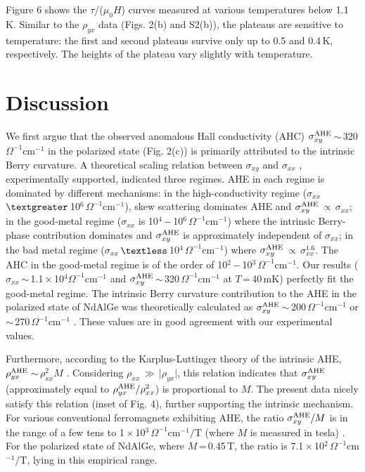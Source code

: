 \documentclass[%
preprint,
 amsmath,amssymb,
 aps,
]{revtex4-2}
\begin{document}
%
Figure 6 shows the $\tau$/($\mu_{0}H$) curves measured at various temperatures below 1.1 K. 
%
Similar to the $\rho_{yx}$ data (Figs. 2(b) and S2(b)), 
the plateaus are sensitive to temperature: 
the first and second plateaus survive only up to 0.5 and 0.4\,K, respectively. 
%
The heights of the plateau vary slightly with temperature.  
%

\section{Discussion}

%
We first argue that the observed anomalous Hall conductivity (AHC) 
$\sigma_{xy}^{\rm AHE}$\,$\sim$\,320\,$\Omega^{-1}$cm$^{-1}$ in the polarized state (Fig. 2(c)) 
is primarily attributed to the intrinsic Berry curvature. 
%
A theoretical scaling relation between $\sigma_{xy}$ and $\sigma_{xx}$ 
\cite{Onoda_PhyRevB_2008,Nagaosa_RevModPhys_2010,Chen_NatCommun_2021}, 
experimentally supported, indicated three regimes. 
%
AHE in each regime is dominated by different mechanisms: 
in the high-conductivity regime ($\sigma_{xx}$\,$\textgreater$\,10$^{6}$\,$\Omega^{-1}$cm$^{-1}$), 
skew scattering dominates AHE and $\sigma_{xy}^{\rm AHE}$\,$\propto$\,$\sigma_{xx}$; 
%
in the good-metal regime ($\sigma_{xx}$ is 10$^{4}$\,$-$\,10$^{6}$\,$\Omega^{-1}$cm$^{-1}$) 
where the intrinsic Berry-phase contribution dominates and 
$\sigma_{xy}^{\rm AHE}$ is approximately independent of $\sigma_{xx}$; 
%
in the bad metal regime ($\sigma_{xx}$\,$\textless$\,10$^{4}$\,$\Omega^{-1}$cm$^{-1}$) 
where $\sigma_{xy}^{\rm AHE}$\,$\propto$\,$\sigma_{xx}^{1.6}$. 
%
The AHC in the good-metal regime is of the order of 
10$^{2}$\,$-$\,10$^{3}$\,$\Omega^{-1}$cm$^{-1}$. 
%
Our results ($\sigma_{xx}$\,$\sim$\,1.1\,$\times$\,10$^{4}$$\Omega^{-1}$cm$^{-1}$ 
and $\sigma_{xy}^{\rm AHE}$\,$\sim$\,320\,$\Omega^{-1}$cm$^{-1}$ at $T$\,=\,40\,mK) 
perfectly fit the good-metal regime. 
%
The intrinsic Berry curvature contribution to the AHE in the polarized state of NdAlGe was theoretically calculated as $\sigma_{xy}^{\rm AHE}$\,$\sim$\,200\,$\Omega^{-1}$cm$^{-1}$ 
\cite{Yang_PhysRevMater_2023} or $\sim$\,270\,$\Omega^{-1}$cm$^{-1}$ 
\cite{Dhital_PhyrevB_2023}. 
%
These values are in good agreement with our experimental values. 
%

%
Furthermore, according to the Karplus-Luttinger theory of the intrinsic AHE, 
$\rho_{yx}^{\rm AHE}$\,$\sim$\,$\rho_{xx}^{2}$$M$ \cite{Karplus_PhysRev_1954}. 
%
Considering $\rho_{xx}$\,$\gg$\,$\lvert$$\rho_{yx}$$\rvert$, 
this relation indicates that $\sigma_{xy}^{\rm AHE}$ 
(approximately equal to $\rho_{yx}^{\rm AHE}/\rho_{xx}^{\rm 2}$) is proportional to $M$. 
%
The present data nicely satisfy this relation (inset of Fig. 4), 
further supporting the intrinsic mechanism. 
%
For various conventional ferromagnets exhibiting AHE, 
the ratio $\sigma_{xy}^{\rm AHE}/M$ is in the range of a few tens to 
1\,$\times$\,10$^{3}$\,$\Omega^{-1}$cm$^{-1}/$T (where $M$ is measured in tesla) 
\cite{Nakatsuji_AnnualReview_2022}. 
%
For the polarized state of NdAlGe, 
where $M$\,=\,0.45\,T, the ratio is 7.1\,$\times$\,10$^{2}$\,$\Omega^{-1}$cm$^{-1}/$T, 
lying in this empirical range. 
%
\end{document}
